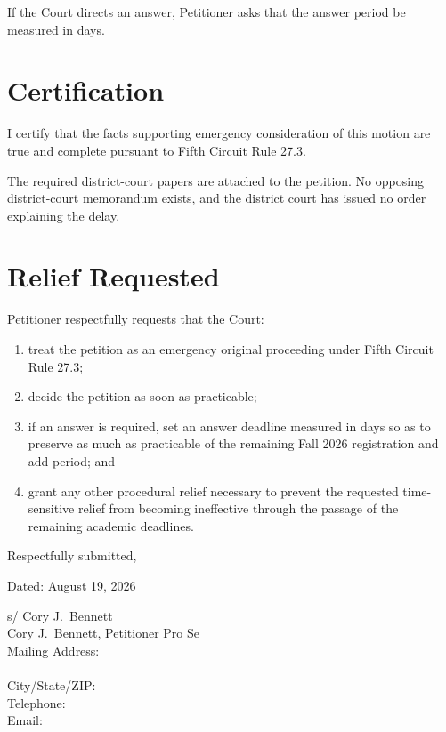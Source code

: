 \documentclass[14pt]{extarticle}
\renewcommand{\FilingDate}{August 19, 2026}
\begin{document}
If the Court directs an answer, Petitioner asks that the answer period be measured in days.

\section*{Certification}

I certify that the facts supporting emergency consideration of this motion are true and complete pursuant to Fifth Circuit Rule 27.3.

The required district-court papers are attached to the petition. No opposing district-court memorandum exists, and the district court has issued no order explaining the delay.

\section*{Relief Requested}

Petitioner respectfully requests that the Court:

\begin{enumerate}
\item treat the petition as an emergency original proceeding under Fifth Circuit Rule 27.3;
\item decide the petition as soon as practicable;
\item if an answer is required, set an answer deadline measured in days so as to preserve as much as practicable of the remaining Fall 2026 registration and add period; and
\item grant any other procedural relief necessary to prevent the requested time-sensitive relief from becoming ineffective through the passage of the remaining academic deadlines.
\end{enumerate}

\singlespacing
\vspace{0.55em}
\noindent Respectfully submitted,

\vspace{0.15em}
\noindent Dated: \FilingDate

\vspace{0.15em}
\noindent s/ Cory J.\ Bennett\\
Cory J.\ Bennett, Petitioner Pro Se\\
Mailing Address: \FilingPlaintiffMailingLineOne\\
\phantom{Mailing Address: }\FilingPlaintiffMailingLineTwo\\
City/State/ZIP: \FilingPlaintiffMailingCityStateZip\\
Telephone: \FilingPlaintiffTelephone\\
Email: \FilingPlaintiffEmail
\end{document}
